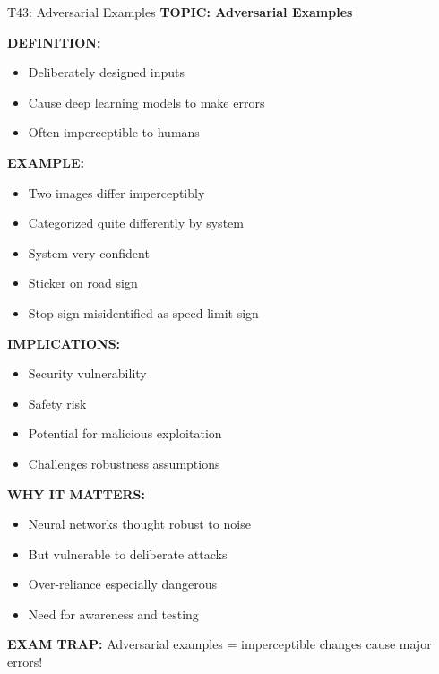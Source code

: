 \documentclass[8pt]{beamer}
\begin{document}
	\begin{frame}{T43: Adversarial Examples}
		\fontsize{6.5}{7.5}\selectfont
		\textbf{TOPIC: Adversarial Examples}
		
		\vspace{0.1cm}
		\textbf{DEFINITION:}
		\begin{itemize}
			\item Deliberately designed inputs
			\item Cause deep learning models to make errors
			\item Often imperceptible to humans
		\end{itemize}
		
		\vspace{0.1cm}
		\textbf{EXAMPLE:}
		\begin{itemize}
			\item Two images differ imperceptibly
			\item Categorized quite differently by system
			\item System very confident
			\item Sticker on road sign
			\item Stop sign misidentified as speed limit sign
		\end{itemize}
		
		\vspace{0.1cm}
		\textbf{IMPLICATIONS:}
		\begin{itemize}
			\item Security vulnerability
			\item Safety risk
			\item Potential for malicious exploitation
			\item Challenges robustness assumptions
		\end{itemize}
		
		\vspace{0.1cm}
		\textbf{WHY IT MATTERS:}
		\begin{itemize}
			\item Neural networks thought robust to noise
			\item But vulnerable to deliberate attacks
			\item Over-reliance especially dangerous
			\item Need for awareness and testing
		\end{itemize}
		
		\textcolor{myred}{\textbf{EXAM TRAP:}} Adversarial examples = \textcolor{myblue}{imperceptible changes cause major errors}!
	\end{frame}
	
\end{document}
